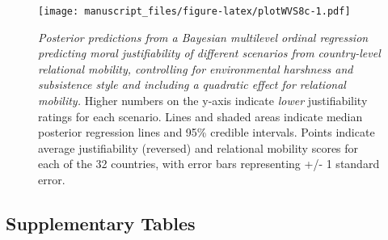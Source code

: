 \documentclass[
  man,floatsintext]{apa6}
\begin{document}
\begin{figure}
\centering
\texttt{[image: manuscript\_files/figure-latex/plotWVS8c-1.pdf]}
\caption{\label{fig:plotWVS8c}\emph{Posterior predictions from a Bayesian multilevel ordinal regression predicting moral justifiability of different scenarios from country-level relational mobility, controlling for environmental harshness and subsistence style and including a quadratic effect for relational mobility.} Higher numbers on the y-axis indicate \emph{lower} justifiability ratings for each scenario. Lines and shaded areas indicate median posterior regression lines and 95\% credible intervals. Points indicate average justifiability (reversed) and relational mobility scores for each of the 32 countries, with error bars representing +/- 1 standard error.}
\end{figure}

\newpage

\hypertarget{supplementary-tables}{%
\subsection{Supplementary Tables}\label{supplementary-tables}}
\end{document}
